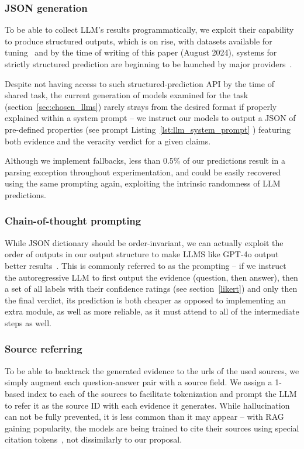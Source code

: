 \subsubsection{JSON generation}

To be able to collect LLM's results programmatically, we exploit their capability to produce structured outputs, which is on  rise, with datasets available for tuning~\cite{tang2024strucbenchlargelanguagemodels} and by the time of writing of this paper (August 2024), systems for strictly structured prediction are beginning to be launched by major providers~\cite{json}.

Despite not having access to such structured-prediction API by the time of \averitec{} shared task, the current generation of models examined for the task (section~\ref{sec:chosen_llms}) rarely strays from the desired format if properly explained within a system prompt -- we instruct our models to output a JSON of pre-defined properties (see prompt Listing~\ref{lst:llm_system_prompt} ) featuring both evidence and the veracity verdict for a given claims.

Although we implement fallbacks, less than 0.5\% of our predictions result in a parsing exception throughout experimentation, and could be easily recovered using the same prompting again, exploiting the intrinsic randomness of LLM predictions.

\subsubsection{Chain-of-thought prompting}
While JSON dictionary should be order-invariant, we can actually exploit the order of outputs in our output structure to make LLMS like GPT-4o output better results~\cite{cot}.
This is commonly referred to as the  prompting -- if we instruct the autoregressive LLM to first output the evidence (question, then answer), then a set of all labels with their confidence ratings (see section~\ref{likert}) and only then the final verdict, its prediction is both cheaper as opposed to implementing an extra module, as well as more reliable, as it must attend to all of the intermediate steps as well.

\subsubsection{Source referring}
To be able to backtrack the generated evidence to the urls of the used sources, we simply augment each question-answer pair with a source field.
We assign a 1-based index to each of the sources to facilitate tokenization and prompt the LLM to refer it as the source ID with each evidence it generates.
While hallucination can not be fully prevented, it is less common than it may appear -- with RAG gaining popularity, the models are being trained to cite their sources using special citation tokens~\cite{menick2022teachinglanguagemodelssupport}, not dissimilarly to our proposal.

